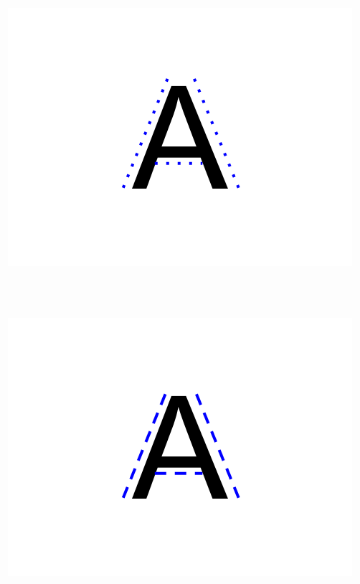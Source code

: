 \begin{figure}[!htbp]
    \centering
    \begin{subfigure}{0.3\textwidth}
        \includegraphics[scale=0.3, trim={10cm 7cm 10cm 7cm},clip]{images/gbem/bleu_score_1.png}
    \end{subfigure}
    ~
    \begin{subfigure}{0.3\textwidth}
        \includegraphics[scale=0.3, trim={10cm 7cm 10cm 7cm},clip]{images/gbem/bleu_score_2.png}
    \end{subfigure}
    ~
    \begin{subfigure}{0.3\textwidth}

\end{subfigure}
\end{figure}

